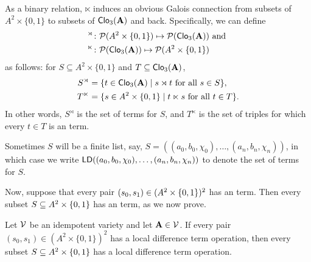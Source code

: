 As a binary relation, $\ltimes$ induces an obvious Galois connection
from subsets of $A^2\times \{0,1\}$ to subsets of $\operatorname{\mathsf{Clo}}_3(\mathbf{A})$ and
back. Specifically, we can define
\begin{align*}
^{\rtimes} &\colon \mathcal{P}(A^2 \times \{0,1\}) \mapsto \mathcal{P}(\operatorname{\mathsf{Clo}}_3(\mathbf{A})) \text{ and }\\
^{\ltimes} &\colon \mathcal{P}(\operatorname{\mathsf{Clo}}_3(\mathbf{A})) \mapsto \mathcal{P}(A^2\times \{0,1\})
\end{align*}
as follows:
for $S \subseteq A^2 \times \{0,1\}$ and $T \subseteq \operatorname{\mathsf{Clo}}_3(\mathbf{A})$,
\begin{align*}
  S^{\rtimes} &= \{t \in \operatorname{\mathsf{Clo}}_3(\mathbf{A}) \mid s \rtimes t
  \text{ for all } s \in S\}, \\
  T^{\ltimes} &= \{s \in A^2 \times \{0,1\} \mid t \ltimes s
  \text{ for all } t \in T\}.
\end{align*}
In other words, $S^\rtimes$ is the set of \ld terms
for $S$, and $T^\ltimes$ is the set of triples for which every $t\in T$ 
is an \ld term.  

Sometimes $S$ will be a finite list, say, 
$S = ((a_0, b_0, \chi_0), \dots, (a_n, b_n, \chi_n))$, in which case 
we write $\mathsf{LD}((a_0, b_0, \chi_0), \dots, (a_n, b_n, \chi_n))$ to 
denote the set of \ld terms for $S$.

Now, suppose that every pair
$(s_0, s_1)\in (A^2 \times \{0,1\})^2$ %
has an \ld term.  
Then every subset $S\subseteq A^2 \times \{0,1\}$
has an \ld term, as we now prove.

\begin{theorem} %
  \label{thm:local-diff-terms}
  Let $\mathcal{V}$ be an idempotent variety and let
  $\mathbf{A}  \in \mathcal{V}$. %
  If every pair
  $(s_0, s_1) \in (A^2 \times \{0,1\})^2$
  has a local difference term operation, then
  every subset $S \subseteq A^2 \times \{0,1\}$
  has a local difference term operation.
\end{theorem}


